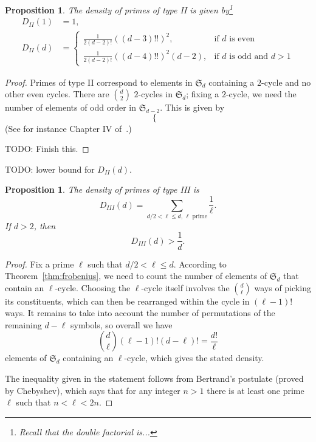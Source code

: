 \documentclass[11pt]{article}
\theoremstyle{plain}
\newtheorem{proposition}[theorem]{Proposition}
\theoremstyle{definition}
\theoremstyle{remark}
\numberwithin{equation}{section}
\renewcommand{\SS}{\mathfrak{S}}
\begin{document}
\begin{proposition}\label{prop:type2}
  The density of primes of type II is given by\footnote{Recall that the \emph{double factorial} is...}
  \begin{align*}
    D_{II}(1)&=1,\\
    D_{II}(d)&=\begin{cases}
        \frac{1}{2(d-2)!}\left((d-3)!!\right)^2,&\text{if }d\text{ is even}\\
        \frac{1}{2(d-2)!}\left((d-4)!!\right)^2(d-2),&\text{if }d\text{ is odd and }d>1
    \end{cases}
  \end{align*}
\end{proposition}
\begin{proof}
  Primes of type II correspond to elements in $\SS_d$ containing a $2$-cycle and no other
  even cycles. There are $\binom{d}{2}$ $2$-cycles in $\SS_d$; fixing a $2$-cycle, we 
  need the number of elements of odd order in $\SS_{d-2}$.  This is given by
  \begin{equation*}
    \begin{cases}

    \end{cases}
  \end{equation*}
  (See for instance Chapter IV of~\cite{Riordan}.)

  TODO: Finish this.
\end{proof}

TODO: lower bound for $D_{II}(d)$.

\begin{proposition}
  The density of primes of type III is
  \begin{equation*}
    D_{III}(d)=\sum_{d/2<\ell\leq d, \,\ell\text{ prime}} \frac{1}{\ell}.
  \end{equation*}
  If $d>2$, then
  \begin{equation*}
    D_{III}(d)>\frac{1}{d}.
  \end{equation*}
\end{proposition}
\begin{proof}
  Fix a prime $\ell$ such that $d/2<\ell\leq d$.  According to
  Theorem~\ref{thm:frobenius}, we need to count the number of elements of
  $\SS_d$ that contain an $\ell$-cycle.  Choosing the $\ell$-cycle itself
  involves the $\binom{d}{\ell}$ ways of picking its constituents, which can
  then be rearranged within the cycle in $(\ell-1)!$ ways.  It remains to
  take into account the number of permutations of the remaining $d-\ell$ symbols,
  so overall we have
  \begin{equation*}
    \binom{d}{\ell}(\ell-1)!(d-\ell)!=\frac{d!}{\ell}
  \end{equation*}
  elements of $\SS_d$ containing an $\ell$-cycle, which gives the stated
  density.

  The inequality given in the statement follows from Bertrand's postulate
  (proved by Chebyshev), which says that for any integer $n>1$ there is at
  least one prime $\ell$ such that $n<\ell<2n$.
\end{proof}
\end{document}
